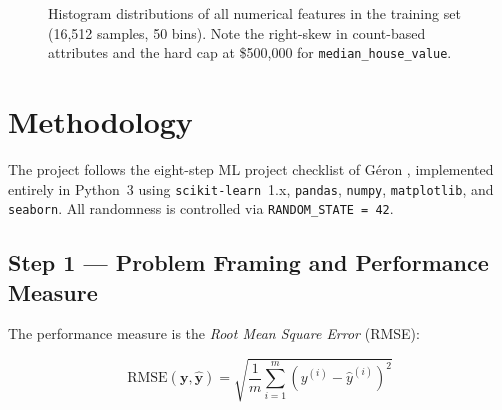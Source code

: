 \documentclass[conference]{IEEEtran}
\begin{document}
\begin{figure}[H]
    \centering
    \caption{Histogram distributions of all numerical features in the training set (16,512 samples, 50 bins). Note the right-skew in count-based attributes and the hard cap at \$500,000 for \texttt{median\_house\_value}.}
    \label{fig:distributions}
\end{figure}

\section{Methodology}
\label{sec:methodology}

The project follows the eight-step ML project checklist of Géron \cite{geron2019}, implemented entirely in Python~3 using \texttt{scikit-learn}~1.x, \texttt{pandas}, \texttt{numpy}, \texttt{matplotlib}, and \texttt{seaborn}. All randomness is controlled via \texttt{RANDOM\_STATE = 42}.

\subsection{Step 1 — Problem Framing and Performance Measure}

The performance measure is the \emph{Root Mean Square Error} (RMSE):

\begin{equation}
    \mathrm{RMSE}(\mathbf{y}, \hat{\mathbf{y}}) = \sqrt{\frac{1}{m}\sum_{i=1}^{m}\left(y^{(i)} - \hat{y}^{(i)}\right)^{2}}
    \label{eq:rmse}
\end{equation}
\end{document}
